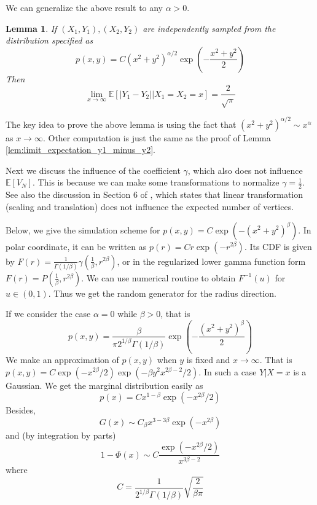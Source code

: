 \documentclass{article}
\newtheorem{lemma}{Lemma}
\def\E{\mathbb{E}}
\begin{document}
We can generalize the above result to any $\alpha>0$.
\begin{lemma}
    If $(X_1,Y_1), (X_2,Y_2)$ are independently
    sampled from the distribution specified as
    \begin{equation}\label{eq:exponential_tail_2d_alpha}
        p(x,y) = C(x^2+y^2)^{\alpha/2} \exp(-\frac{x^2+y^2}{2})    
    \end{equation}   
    Then 
    \begin{equation}\label{eq:abs_y1_y2_x_exp_tail_2}
    \lim_{x\to \infty} \E[|Y_1-Y_2| \Big\vert X_1=X_2=x] = \frac{2}{\sqrt{\pi}}
    \end{equation}
    \end{lemma}
The key idea to prove the above lemma is using the fact that
$(x^2+y^2)^{\alpha/2} \sim x^{\alpha}$ as $x\to \infty$.
Other computation is just the same as the proof of Lemma \ref{lem:limit_expectation_y1_minus_y2}.

Next we discuss the influence of the coefficient $\gamma$, which also does not influence $\E[V_N]$.
This is because we can make some transformations to normalize $\gamma=\frac{1}{2}$.
See also the discussion in Section 6 of \cite{efron1965convex}, which states that
linear transformation (scaling and translation)
does not influence the expected number of vertices.

Below, we give the simulation scheme
for $p(x,y)=C\exp(-(x^2+y^2)^\beta)$.
In polar coordinate, it can be written as
$p(r) = C r \exp(-r^{2\beta})$.
Its CDF is given by $F(r) = \frac{1}{\Gamma(1/\beta)}
\gamma(\frac{1}{\beta}, r^{2\beta})$,
or in the regularized lower gamma function
form $F(r) = P(\frac{1}{\beta}, r^{2\beta})$.
We can use numerical routine to obtain $F^{-1}(u)$
for $u\in (0,1)$. Thus we get the random generator for
the radius direction.

If we consider the case $\alpha=0$ while $\beta > 0$,
that is
$$
p(x,y)=\frac{\beta}{\pi 2^{1/\beta} \Gamma(1/\beta)}
\exp \left(-\frac{(x^2+y^2)^{\beta}}{2} \right)
$$
We make an approximation of $p(x,y)$ when $y$ is fixed and $x\to \infty$.
That is
$p(x,y)=C \exp(-x^{2\beta}/2) \exp(-\beta y^2 x^{2\beta-2}/2)$.
In such a case $Y|X=x$ is a Gaussian.
We get the marginal distribution easily as 
$$
p(x) =C x^{1-\beta} \exp(-x^{2\beta}/2)
$$
Besides,
$$
G(x)
\sim C_{\beta} x^{3-3\beta} \exp(-x^{2\beta})
$$
and (by integration by parts)
$$
1-\Phi(x) \sim C\frac{\exp(-x^{2\beta}/2)}{x^{3\beta - 2}}
$$ 
where
$$
C=\frac{1}{2^{1/\beta} \Gamma(1/\beta)} \sqrt{\frac{2}{\beta \pi}
}$$
\end{document}
